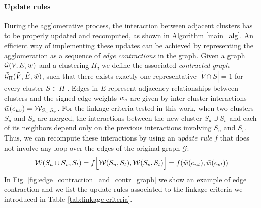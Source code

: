 \paragraph*{Update rules} During the agglomerative process, the interaction between adjacent clusters has to be properly updated and recomputed, as shown in Algorithm \ref{main_alg}.  %
An efficient way of implementing these updates can be achieved by representing the agglomeration as a sequence of \emph{edge contractions} in the graph. Given a graph $\mathcal{G}(V,E,w)$ and a clustering $\Pi$, we define the associated \emph{contracted graph} $\tilde{\mathcal{G}}_\Pi(\tilde{V}, \tilde{E}, \tilde{w})$, such that there exists exactly one representative $|\tilde{V} \cap S| = 1$ for every cluster $S \in \Pi$ . Edges in $\tilde{E}$ represent adjacency-relationships between clusters 
and the signed edge weights $\tilde{w}_e$ are given by inter-cluster interactions $\tilde{w}(e_{uv})=\mathcal{W}_{S_u,S_v}$. 
For the linkage criteria tested in this work, when two clusters $S_u$ and $S_v$ are merged, the interactions between the new cluster $S_u \cup S_v$ and each of its neighbors depend only on the previous interactions involving $S_u$ and $S_v$. Thus, we can recompute these interactions by using an \emph{update rule} $f$ that does not involve any loop over the edges of the original graph $\mathcal{G}$:
\begin{equation}
  \interact(S_u \cup S_v,S_t) = f\Big[ \interact(S_u,S_t), \interact(S_v,S_t) \Big] = f(\tilde{\cost}(e_{ut}), \tilde{\cost}(e_{vt})) %
\end{equation}
In Fig. \ref{fig:edge_contraction_and_contr_graph} we show an example of edge contraction and we list the update rules associated to the linkage criteria we introduced in Table \ref{tab:linkage-criteria}.


